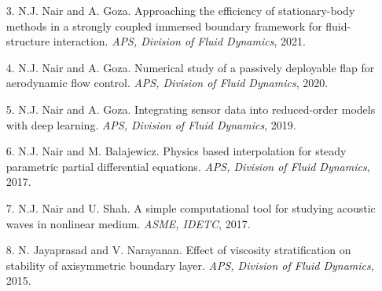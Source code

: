 \documentclass[margin]{res}
\begin{document}
\begin{resume}
\begin{itemize}
 \item[3.] N.J. Nair and A. Goza. Approaching the efficiency of stationary-body methods in a strongly coupled immersed boundary framework for fluid-structure interaction. \textit{APS, Division of Fluid Dynamics}, 2021.
	
 \item[4.] N.J. Nair and A. Goza. Numerical study of a passively deployable flap for aerodynamic flow control. \textit{APS, Division of Fluid Dynamics}, 2020.
 
 \item[5.] N.J. Nair and A. Goza. Integrating sensor data into reduced-order models with deep learning. \textit{APS, Division of Fluid Dynamics}, 2019.

 \item[6.] N.J. Nair and M. Balajewicz. Physics based interpolation for steady parametric partial differential equations. \textit{APS, Division of Fluid Dynamics}, 2017.
 
 \item[7.] N.J. Nair and U. Shah. A simple computational tool for studying acoustic waves in nonlinear medium. \textit{ASME, IDETC}, 2017.
 
 \item[8.] N. Jayaprasad and V. Narayanan. Effect of viscosity stratification on stability of axisymmetric boundary layer. \textit{APS, Division of Fluid Dynamics}, 2015.
  
\end{itemize}
		 
%
%
		 

\end{resume}
\end{document}
